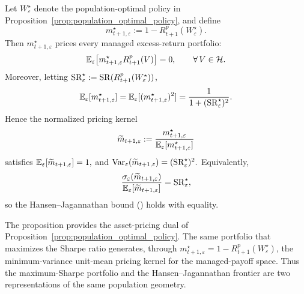     
\begin{proposition}
\label{prop:sdf_hj}

Let $W^\star_\varepsilon$ denote the population-optimal policy in
Proposition~\ref{prop:population_optimal_policy}, and define
\[
m^\star_{t+1,\varepsilon}
:=
1-R^p_{t+1}(W^\star_\varepsilon).
\]
Then $m^\star_{t+1,\varepsilon}$ prices every managed excess-return portfolio:
\[
\mathbb{E}_\varepsilon\!\left[
m^\star_{t+1,\varepsilon}
R^p_{t+1}(V)
\right]
=
0,
\qquad
\forall\,V\in\mathcal{H}.
\]
Moreover, letting
$\operatorname{SR}^\star_\varepsilon
:=
\operatorname{SR}(R^p_{t+1}(W^\star_\varepsilon))$,
\[
\mathbb{E}_\varepsilon[m^\star_{t+1,\varepsilon}]
=
\mathbb{E}_\varepsilon[(m^\star_{t+1,\varepsilon})^2]
=
\frac{1}{1+(\operatorname{SR}^\star_\varepsilon)^2}.
\]
Hence the normalized pricing kernel
\[
\widetilde m_{t+1,\varepsilon}
:=
\frac{
m^\star_{t+1,\varepsilon}
}{
\mathbb{E}_\varepsilon[m^\star_{t+1,\varepsilon}]
}
\]
satisfies
$
\mathbb{E}_\varepsilon[\widetilde m_{t+1,\varepsilon}]
=
1,
$
and
$
\operatorname{Var}_\varepsilon(\widetilde m_{t+1,\varepsilon})
=
(\operatorname{SR}^\star_\varepsilon)^2.
$
Equivalently,
\[
\frac{
\sigma_\varepsilon(\widetilde m_{t+1,\varepsilon})
}{
\mathbb{E}_\varepsilon[\widetilde m_{t+1,\varepsilon}]
}
=
\operatorname{SR}^\star_\varepsilon,
\]
so the Hansen--Jagannathan bound (\citep{hansenjagannathan1991}) holds with equality.
\end{proposition}
The proposition provides the asset-pricing dual of
Proposition~\ref{prop:population_optimal_policy}. The same portfolio that
maximizes the Sharpe ratio generates, through
$m^\star_{t+1,\varepsilon}=1-R^p_{t+1}(W^\star_\varepsilon)$, the
minimum-variance unit-mean pricing kernel for the managed-payoff space.
Thus the maximum-Sharpe portfolio and the Hansen--Jagannathan frontier are
two representations of the same population geometry.

